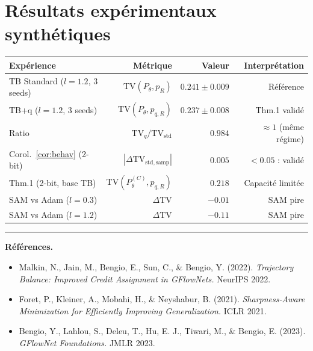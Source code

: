 \documentclass[11pt,a4paper]{article}
\theoremstyle{plain}
\theoremstyle{definition}
\theoremstyle{remark}
\newcommand{\pth}{P_\theta}
\newcommand{\pR}{p_R}
\newcommand{\TV}{\mathrm{TV}}
\begin{document}
\section{Résultats expérimentaux synthétiques}
\label{app:results}

\begin{center}
\begin{tabular}{lrrr}
\toprule
Expérience & Métrique & Valeur & Interprétation \\
\midrule
TB Standard ($l=1.2$, 3 seeds) & $\TV(\pth, \pR)$ & $0.241 \pm 0.009$ & Référence \\
TB+q ($l=1.2$, 3 seeds) & $\TV(\pth, p_{q,R})$ & $0.237 \pm 0.008$ & Thm.1 validé \\
Ratio & $\TV_{q}/\TV_{\mathrm{std}}$ & $0.984$ & $\approx 1$ (même régime) \\
\midrule
Corol.~\ref{cor:behav} (2-bit) & $|\Delta\TV_{\mathrm{std,samp}}|$ & $0.005$ & $< 0.05$ : validé \\
Thm.1 (2-bit, base TB) & $\TV(\pth^{(C)}, p_{q,R})$ & $0.218$ & Capacité limitée \\
\midrule
SAM vs Adam ($l=0.3$) & $\Delta\TV$ & $-0.01$ & SAM pire \\
SAM vs Adam ($l=1.2$) & $\Delta\TV$ & $-0.11$ & SAM pire \\
\bottomrule
\end{tabular}
\end{center}

\bigskip
\hrule
\bigskip

\noindent\textbf{Références.}

\begin{itemize}
  \item Malkin, N., Jain, M., Bengio, E., Sun, C., \& Bengio, Y. (2022).
    \emph{Trajectory Balance: Improved Credit Assignment in GFlowNets.}
    NeurIPS 2022.
  \item Foret, P., Kleiner, A., Mobahi, H., \& Neyshabur, B. (2021).
    \emph{Sharpness-Aware Minimization for Efficiently Improving Generalization.}
    ICLR 2021.
  \item Bengio, Y., Lahlou, S., Deleu, T., Hu, E. J., Tiwari, M., \& Bengio, E. (2023).
    \emph{GFlowNet Foundations.} JMLR 2023.
\end{itemize}
\end{document}
